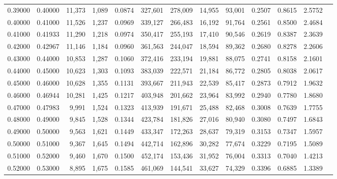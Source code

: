 \begin{tabular}{rrrrrrrrrrrrr}
0.39000 & 0.40000 & 11,373 & 1,089 &                                     0.0874 & 327,601 & 278,009 &  14,955 &  93,001 & 0.2507 & 0.8615 & 2.5752 \\
0.40000 & 0.41000 & 11,526 & 1,237 &                                     0.0969 & 339,127 & 266,483 &  16,192 &  91,764 & 0.2561 & 0.8500 & 2.4684 \\
0.41000 & 0.41933 & 11,290 & 1,218 &                                     0.0974 & 350,417 & 255,193 &  17,410 &  90,546 & 0.2619 & 0.8387 & 2.3639 \\
0.42000 & 0.42967 & 11,146 & 1,184 &                                     0.0960 & 361,563 & 244,047 &  18,594 &  89,362 & 0.2680 & 0.8278 & 2.2606 \\
0.43000 & 0.44000 & 10,853 & 1,287 &                                     0.1060 & 372,416 & 233,194 &  19,881 &  88,075 & 0.2741 & 0.8158 & 2.1601 \\
0.44000 & 0.45000 & 10,623 & 1,303 &                                     0.1093 & 383,039 & 222,571 &  21,184 &  86,772 & 0.2805 & 0.8038 & 2.0617 \\
0.45000 & 0.46000 & 10,628 & 1,355 &                                     0.1131 & 393,667 & 211,943 &  22,539 &  85,417 & 0.2873 & 0.7912 & 1.9632 \\
0.46000 & 0.46944 & 10,281 & 1,425 &                                     0.1217 & 403,948 & 201,662 &  23,964 &  83,992 & 0.2940 & 0.7780 & 1.8680 \\
0.47000 & 0.47983 &  9,991 & 1,524 &                                     0.1323 & 413,939 & 191,671 &  25,488 &  82,468 & 0.3008 & 0.7639 & 1.7755 \\
0.48000 & 0.49000 &  9,845 & 1,528 &                                     0.1344 & 423,784 & 181,826 &  27,016 &  80,940 & 0.3080 & 0.7497 & 1.6843 \\
0.49000 & 0.50000 &  9,563 & 1,621 &                                     0.1449 & 433,347 & 172,263 &  28,637 &  79,319 & 0.3153 & 0.7347 & 1.5957 \\
0.50000 & 0.51000 &  9,367 & 1,645 &                                     0.1494 & 442,714 & 162,896 &  30,282 &  77,674 & 0.3229 & 0.7195 & 1.5089 \\
0.51000 & 0.52000 &  9,460 & 1,670 &                                     0.1500 & 452,174 & 153,436 &  31,952 &  76,004 & 0.3313 & 0.7040 & 1.4213 \\
0.52000 & 0.53000 &  8,895 & 1,675 &                                     0.1585 & 461,069 & 144,541 &  33,627 &  74,329 & 0.3396 & 0.6885 & 1.3389 \\

\end{tabular}
